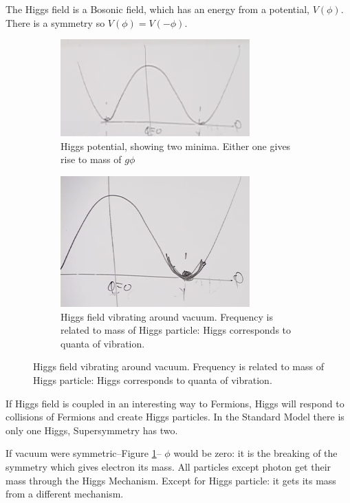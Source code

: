 \documentclass[]{article}
\begin{document}
The Higgs field is a Bosonic field, which has an energy from a potential, $V(\phi)$. There is a symmetry so $V(\phi)=V(-\phi)$.

\begin{figure}[H]
	\caption[Higgs potential]{Higgs potential: reason for shape not fully understood at time of lecture.}
	\begin{subfigure}{0.5\textwidth}
		\caption{Higgs potential, showing two minima. Either one gives rise to mass of $g\phi$}\label{fig:higgs:potential}
		\includegraphics[width=0.8\textwidth]{higgs-potential}
	\end{subfigure}
	\begin{subfigure}{0.5\textwidth}
		\caption{Higgs field vibrating around vacuum. Frequency is related to mass of Higgs particle: Higgs corresponds to quanta of vibration.}
		\includegraphics[width=0.8\textwidth]{higgs-vibrating}
	\end{subfigure}
\end{figure}

If Higgs field is coupled in an interesting way to Fermions, Higgs will respond to collisions of Fermions and create Higgs particles. In the Standard Model there is only one Higgs, Supersymmetry has two.

If vacuum were symmetric--Figure \ref{fig:higgs:potential}-- $\phi$ would be zero: it is the breaking of the symmetry which gives electron its mass. All particles except photon get their mass through the Higgs Mechanism. Except for Higgs particle: it gets its mass from a different mechanism.
\end{document}

